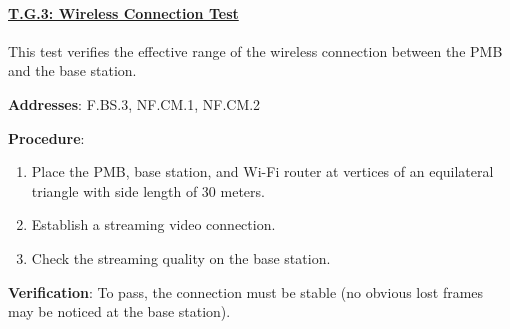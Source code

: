 %

\paragraph{\underline{T.G.3: Wireless Connection Test}}

This test verifies the effective range of the wireless connection between the PMB and the base station.

\textbf{Addresses}: F.BS.3, NF.CM.1, NF.CM.2

\textbf{Procedure}:
\begin{enumerate}[noitemsep]
    \item Place the PMB, base station, and Wi-Fi router at vertices of an equilateral triangle with side length of 30 meters.
    \item Establish a streaming video connection.
    \item Check the streaming quality on the base station.
\end{enumerate}

\textbf{Verification}: 
To pass, the connection must be stable (no obvious lost frames may be noticed at the base station).